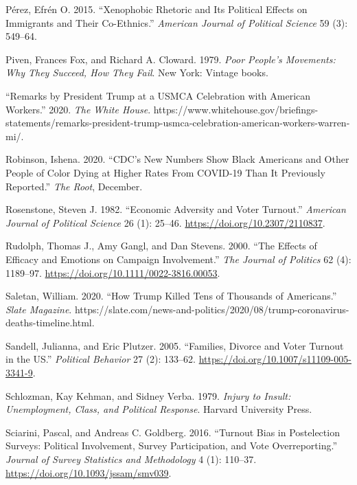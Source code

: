\documentclass[
  12pt,
]{article}
\newlength{\cslhangindent}
\newlength{\cslentryspacingunit} %
\newenvironment{CSLReferences}[2] %
 {%
  \setlength{\parindent}{0pt}
  \ifodd #1
  \let\oldpar\par
  \def\par{\hangindent=\cslhangindent\oldpar}
  \fi
  \setlength{\parskip}{#2\cslentryspacingunit}
 }%
 {}
\begin{document}
\begin{CSLReferences}{1}{0}
\leavevmode{}%
Pérez, Efrén O. 2015. {``Xenophobic {Rhetoric} and {Its Political Effects} on {Immigrants} and {Their Co-Ethnics}.''} \emph{American Journal of Political Science} 59 (3): 549--64.

\leavevmode{}%
Piven, Frances Fox, and Richard A. Cloward. 1979. \emph{Poor People's Movements: Why They Succeed, How They Fail}. {New York}: {Vintage books}.

\leavevmode{}%
{``Remarks by {President Trump} at a {USMCA Celebration} with {American Workers}.''} 2020. \emph{The White House}. https://www.whitehouse.gov/briefings-statements/remarks-president-trump-usmca-celebration-american-workers-warren-mi/.

\leavevmode{}%
Robinson, Ishena. 2020. {``{CDC}'s {New Numbers Show Black Americans} and {Other People} of {Color Dying} at {Higher Rates From COVID-19 Than It Previously Reported}.''} \emph{The Root}, December.

\leavevmode{}%
Rosenstone, Steven J. 1982. {``Economic {Adversity} and {Voter Turnout}.''} \emph{American Journal of Political Science} 26 (1): 25--46. \url{https://doi.org/10.2307/2110837}.

\leavevmode{}%
Rudolph, Thomas J., Amy Gangl, and Dan Stevens. 2000. {``The {Effects} of {Efficacy} and {Emotions} on {Campaign Involvement}.''} \emph{The Journal of Politics} 62 (4): 1189--97. \url{https://doi.org/10.1111/0022-3816.00053}.

\leavevmode{}%
Saletan, William. 2020. {``How {Trump Killed Tens} of {Thousands} of {Americans}.''} \emph{Slate Magazine}. https://slate.com/news-and-politics/2020/08/trump-coronavirus-deaths-timeline.html.

\leavevmode{}%
Sandell, Julianna, and Eric Plutzer. 2005. {``Families, Divorce and Voter Turnout in the {US}.''} \emph{Political Behavior} 27 (2): 133--62. \url{https://doi.org/10.1007/s11109-005-3341-9}.

\leavevmode{}%
Schlozman, Kay Kehman, and Sidney Verba. 1979. \emph{Injury to {Insult}: {Unemployment}, {Class}, and {Political Response}}. {Harvard University Press}.

\leavevmode{}%
Sciarini, Pascal, and Andreas C. Goldberg. 2016. {``Turnout {Bias} in {Postelection Surveys}: {Political Involvement}, {Survey Participation}, and {Vote Overreporting}.''} \emph{Journal of Survey Statistics and Methodology} 4 (1): 110--37. \url{https://doi.org/10.1093/jssam/smv039}.


\end{CSLReferences}
\end{document}
